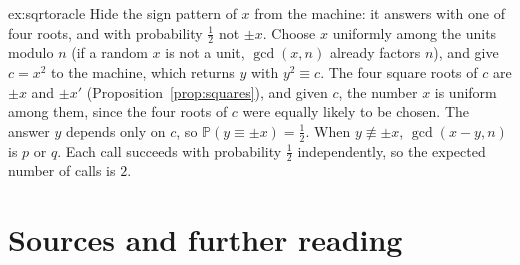 \begin{solution}{ex:sqrtoracle}
\idea Hide the sign pattern of $x$ from the machine: it answers with one of four roots, and with probability $\frac12$ not $\pm x$.
\writeup Choose $x$ uniformly among the units modulo $n$ (if a random $x$ is not a unit, $\gcd(x,n)$ already factors $n$), and give $c=x^2$ to the machine, which returns $y$ with $y^2\equiv c$. The four square roots of $c$ are $\pm x$ and $\pm x'$ (Proposition~\ref{prop:squares}), and given $c$, the number $x$ is uniform among them, since the four roots of $c$ were equally likely to be chosen. The answer $y$ depends only on $c$, so
$\mathbb P(y\equiv\pm x)=\frac12$. When $y\not\equiv\pm x$, $\gcd(x-y,n)$ is $p$ or $q$. Each call succeeds with probability $\frac12$ independently, so the expected number of calls is $2$.
\end{solution}

\section*{Sources and further reading}

